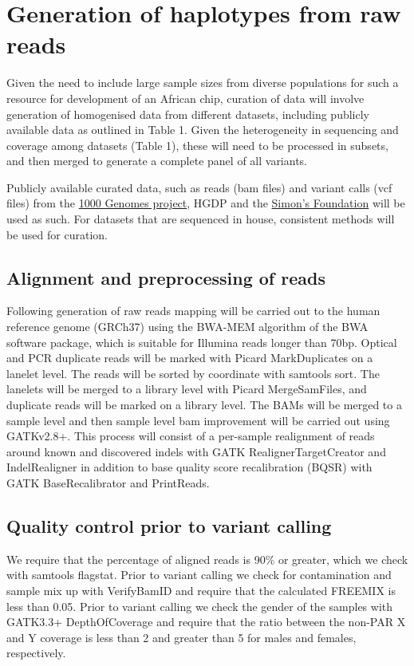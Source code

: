 \section{Generation of haplotypes from raw reads}
Given the need to include large sample sizes from diverse populations for such a resource for development of an African chip, curation of data will involve generation of homogenised data from different datasets, including publicly available data as outlined in Table 1. Given the heterogeneity in sequencing and coverage among datasets (Table 1), these will need to be processed in subsets, and then merged to generate a complete panel of all variants. 

Publicly available curated data, such as reads (bam files) and variant calls (vcf files) from the \href{http://www.1000genomes.org}{1000 Genomes project}, HGDP and the \href{http://www.simonsfoundation.org/}{Simon’s Foundation} will be used as such. For datasets that are sequenced in house, consistent methods will be used for curation.

\subsection{Alignment and preprocessing of reads}
Following generation of raw reads mapping will be carried out to the human reference genome (GRCh37) using the BWA-MEM algorithm of the BWA software package, which is suitable for Illumina reads longer than 70bp.\cite{2013arXiv1303.3997L} Optical and PCR duplicate reads will be marked with Picard MarkDuplicates on a lanelet level. The reads will be sorted by coordinate with samtools sort. The lanelets will be merged to a library level with Picard MergeSamFiles, and duplicate reads will be marked on a library level. The BAMs will be merged to a sample level and then sample level bam improvement will be carried out using GATKv2.8+. This process will consist of a per-sample realignment of reads around known and discovered indels with GATK RealignerTargetCreator and IndelRealigner in addition to base quality score recalibration (BQSR) with GATK BaseRecalibrator and PrintReads.

\subsection{Quality control prior to variant calling}
We require that the percentage of aligned reads is 90\% or greater, which we check with samtools flagstat. Prior to variant calling we check for contamination and sample mix up with VerifyBamID and require that the calculated FREEMIX is less than 0.05. Prior to variant calling we check the gender of the samples with GATK3.3+ DepthOfCoverage and require that the ratio between the non-PAR X and Y coverage is less than 2 and greater than 5 for males and females, respectively.









